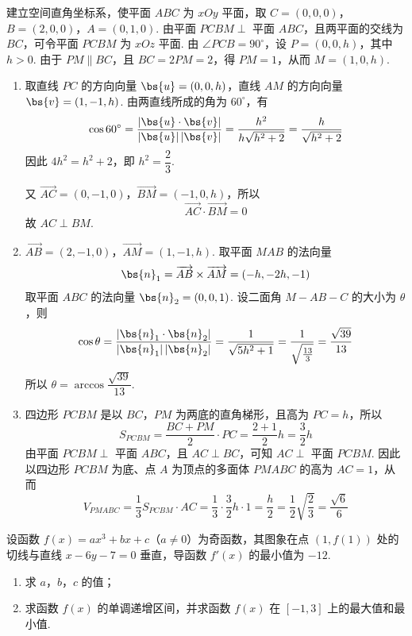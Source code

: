 \begin{solution}
建立空间直角坐标系，使平面 \(ABC\) 为 \(xOy\) 平面，取 \(C=(0,0,0)\)，\(B=(2,0,0)\)，\(A=(0,1,0)\). 由平面 \(PCBM\perp\) 平面 \(ABC\)，且两平面的交线为 \(BC\)，可令平面 \(PCBM\) 为 \(xOz\) 平面. 由 \(\angle PCB=90^{\circ}\)，设 \(P=(0,0,h)\)，其中 \(h>0\). 由于 \(PM\parallel BC\)，且 \(BC=2PM=2\)，得 \(PM=1\)，从而 \(M=(1,0,h)\).

\begin{enumerate}
\item 取直线 \(PC\) 的方向向量 \(\bs{u}=(0,0,h)\)，直线 \(AM\) 的方向向量 \(\bs{v}=(1,-1,h)\). 由两直线所成的角为 \(60^{\circ}\)，有
\[
\cos60^{\circ}=\frac{|\bs{u}\cdot\bs{v}|}{|\bs{u}|\,|\bs{v}|}=\frac{h^{2}}{h\sqrt{h^{2}+2}}=\frac{h}{\sqrt{h^{2}+2}}
\]
因此 \(4h^{2}=h^{2}+2\)，即 \(h^{2}=\dfrac23\).

又 \(\overrightarrow{AC}=(0,-1,0)\)，\(\overrightarrow{BM}=(-1,0,h)\)，所以
\[
\overrightarrow{AC}\cdot\overrightarrow{BM}=0
\]
故 \(AC\perp BM\).
\item \(\overrightarrow{AB}=(2,-1,0)\)，\(\overrightarrow{AM}=(1,-1,h)\). 取平面 \(MAB\) 的法向量
\[
\bs{n}_{1}=\overrightarrow{AB}\times\overrightarrow{AM}=(-h,-2h,-1)
\]
取平面 \(ABC\) 的法向量 \(\bs{n}_{2}=(0,0,1)\). 设二面角 \(M-AB-C\) 的大小为 \(\theta\)，则
\[
\cos\theta=\frac{|\bs{n}_{1}\cdot\bs{n}_{2}|}{|\bs{n}_{1}|\,|\bs{n}_{2}|}=\frac{1}{\sqrt{5h^{2}+1}}=\frac{1}{\sqrt{\frac{13}{3}}}=\frac{\sqrt{39}}{13}
\]
所以 \(\theta=\arccos\dfrac{\sqrt{39}}{13}\).
\item 四边形 \(PCBM\) 是以 \(BC\)，\(PM\) 为两底的直角梯形，且高为 \(PC=h\)，所以
\[
S_{PCBM}=\frac{BC+PM}{2}\cdot PC=\frac{2+1}{2}h=\frac32h
\]
由平面 \(PCBM\perp\) 平面 \(ABC\)，且 \(AC\perp BC\)，可知 \(AC\perp\) 平面 \(PCBM\). 因此以四边形 \(PCBM\) 为底、点 \(A\) 为顶点的多面体 \(PMABC\) 的高为 \(AC=1\)，从而
\[
V_{PMABC}=\frac13S_{PCBM}\cdot AC=\frac13\cdot\frac32h\cdot1=\frac h2=\frac12\sqrt{\frac23}=\frac{\sqrt6}{6}
\]
\end{enumerate}
\end{solution}

\begin{problem}
设函数 \( f(x) = ax^3 + bx + c \)（\(a \neq 0\)）为奇函数，其图象在点 \((1, f(1))\) 处的切线与直线 \( x - 6y - 7 = 0 \) 垂直，导函数 \( f'(x) \) 的最小值为 \(-12\).
\begin{enumerate}
\item 求 \(a\)，\(b\)，\(c\) 的值；
\item 求函数 \( f(x) \) 的单调递增区间，并求函数 \( f(x) \) 在 \( [-1,3] \) 上的最大值和最小值.
\end{enumerate}

\end{problem}

